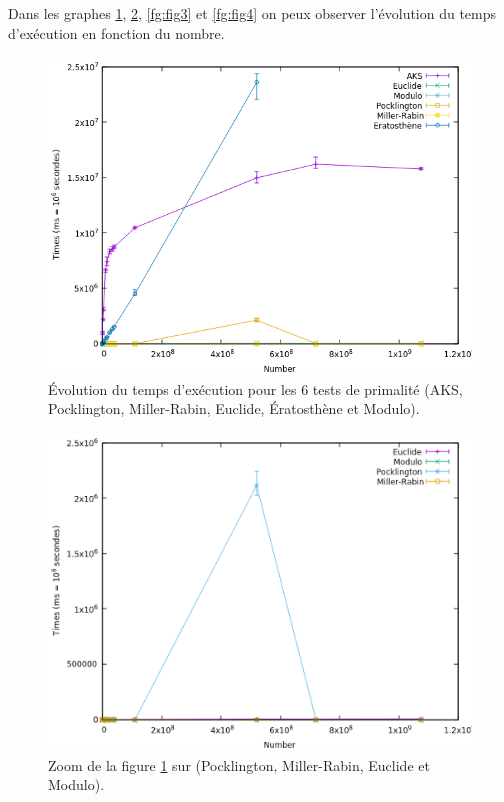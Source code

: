 	Dans les graphes \ref{fg:fig1}, \ref{fg:fig2}, \ref{fg:fig3} et \ref{fg:fig4} on peux observer l'évolution du temps d'exécution en fonction du nombre.
\begin{figure}[!ht]	
		\begin{center}\includegraphics[scale=0.6]{result.png}\end{center}
		\caption{Évolution du temps d'exécution pour les 6 tests de primalité (AKS, Pocklington, Miller-Rabin, Euclide, Ératosthène et Modulo). }
		\label{fg:fig1}
\end{figure}
\begin{figure}[!ht]	
		\begin{center}\includegraphics[scale=0.6]{Zoom1.png}\end{center}
		\caption{Zoom de la figure \ref{fg:fig1} sur (Pocklington, Miller-Rabin, Euclide et Modulo).}
		\label{fg:fig2}
\end{figure}
